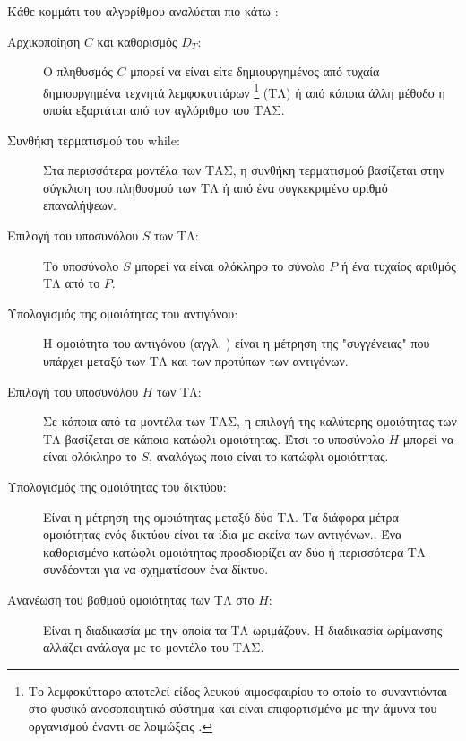 \documentclass{assignment}
\begin{document}
Κάθε κομμάτι του αλγορίθμου αναλύεται πιο κάτω \cite{engelbrecht}:
\begin{description}
\item[Αρχικοποίηση $C$ και καθορισμός $D_T$:] Ο πληθυσμός $C$ μπορεί να είναι είτε δημιουργημένος από τυχαία δημιουργημένα τεχνητά λεμφοκυττάρων \footnote{Το λεμφοκύτταρο αποτελεί είδος λευκού αιμοσφαιρίου το οποίο το συναντιόνται στο φυσικό ανοσοποιητικό σύστημα και είναι επιφορτισμένα με την άμυνα του οργανισμού έναντι σε λοιμώξεις \cite{wiki:lymphocytes}.} (ΤΛ) ή από κάποια άλλη μέθοδο η οποία εξαρτάται από τον αγλόριθμο του ΤΑΣ.

\item[Συνθήκη τερματισμού του while:] Στα περισσότερα μοντέλα των ΤΑΣ, η συνθήκη τερματισμού βασίζεται στην σύγκλιση του πληθυσμού των ΤΛ ή από ένα συγκεκριμένο αριθμό επαναλήψεων.

\item[Επιλογή του υποσυνόλου $S$ των ΤΛ:] Το υποσύνολο $S$ μπορεί να είναι ολόκληρο το σύνολο $P$ ή ένα τυχαίος αριθμός ΤΛ από το $P$. 

\item[Υπολογισμός της ομοιότητας του αντιγόνου:] Η ομοιότητα του αντιγόνου (αγγλ. ) είναι η μέτρηση της "συγγένειας" που υπάρχει μεταξύ των ΤΛ και των προτύπων των αντιγόνων. 

\item[Επιλογή του υποσυνόλου $H$ των ΤΛ:] Σε κάποια από τα μοντέλα των ΤΑΣ, η επιλογή της καλύτερης ομοιότητας των ΤΛ βασίζεται σε κάποιο κατώφλι ομοιότητας. Έτσι το υποσύνολο $H$ μπορεί να είναι ολόκληρο το $S$, αναλόγως ποιο είναι το κατώφλι ομοιότητας.

\item[Υπολογισμός της ομοιότητας του δικτύου:] Είναι η μέτρηση της ομοιότητας μεταξύ δύο ΤΛ. Τα διάφορα μέτρα ομοιότητας ενός δικτύου είναι τα ίδια με εκείνα των αντιγόνων.. Ένα καθορισμένο κατώφλι ομοιότητας προσδιορίζει αν δύο ή περισσότερα ΤΛ συνδέονται για να σχηματίσουν ένα δίκτυο.

\item[Ανανέωση του βαθμού ομοιότητας των ΤΛ στο $H$:] Είναι η διαδικασία με την οποία τα ΤΛ ωριμάζουν. Η διαδικασία ωρίμανσης αλλάζει ανάλογα με το μοντέλο του ΤΑΣ.

\end{description}
\end{document}
